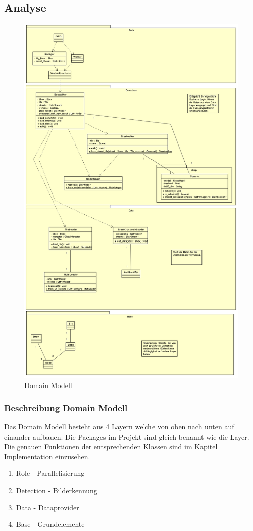 \subsection{Analyse}
\begin{figure}[H]
	\includegraphics[width=\textwidth]{images/domain_model_komplett.png}
	\caption{Domain Modell}
\end{figure}
\subsubsection{Beschreibung Domain Modell}
Das Domain Modell besteht aus 4 Layern welche von oben nach unten auf einander aufbauen. Die Packages im Projekt sind gleich benannt wie die Layer. Die genauen Funktionen der entsprechenden Klassen sind im Kapitel Implementation einzusehen.
\begin{enumerate}
	\item Role - Parallelisierung
	\item Detection - Bilderkennung
	\item Data - Dataprovider
	\item Base - Grundelemente
\end{enumerate}

